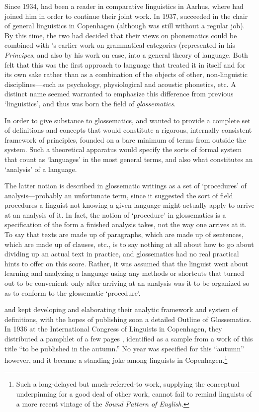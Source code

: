Since 1934, {\Hjelmslev} had been a reader in comparative linguistics in
Aarhus, where {\Uldall} had joined him in order to continue their joint
work. In 1937, {\Hjelmslev} succeeded {\Pedersen} in the chair of general
linguistics in Copenhagen (al\-though {\Uldall} was still without a regular
job). By this time, the two had decided that their views on
phonematics could be combined with {\Hjelmslev}'s earlier work on
grammatical categories (represented in his \textsl{Principes}, and also by his
work \citep{hjelmslev:case} on case, into a general theory of
language. Both felt that this was the first approach to language that
treated it in itself and for its own sake rather than as a combination
of the objects of other, non-linguistic disciplines—such as psychology,
physiological and acoustic phonetics, etc. A distinct name seemed
warranted to emphasize this difference from previous `linguistics',
and thus was born the field of \emph{glossematics}.

In order to give substance to glossematics, {\Hjelmslev} and {\Uldall}
wanted to provide a complete set of definitions and concepts that
would constitute a rigorous, internally consistent framework of
principles, founded on a bare minimum of terms from outside the
system. Such a theoretical apparatus would specify the sorts of formal
system that count as `languages' in the most general terms, and also
what constitutes an `analysis' of a language.

The latter notion is described in glossematic writings as a set of
`procedures' of analysis—probably an unfortunate term, since it
suggested the sort of field procedures a linguist not knowing a given
language might actually apply to arrive at an analysis of it. In
fact, the notion of `procedure' in glossematics is a specification of
the form a finished analysis takes, not the way one arrives at it. To
say that texts are made up of paragraphs, which are made up of
sentences, which are made up of clauses, etc., is to say nothing at
all about how to go about dividing up an actual text in practice, and
glossematics had no real practical hints to offer on this
score. Rather, it was assumed that the linguist went about learning
and analyzing a language using any methods or shortcuts that turned
out to be convenient: only after arriving at an analysis was it to be
organized so as to conform to the glossematic `procedure'.

{\Hjelmslev} and {\Uldall} kept developing and elaborating their analytic
framework and system of definitions, with the hopes of publishing soon
a detailed Outline of Glossematics. In 1936 at the International
Congress of Linguists in Copenhagen, they distributed a pamphlet of a
few pages \citep{hjelmslev.uldall36:outline}, identified as a sample
from a work of this title ``to be published in the autumn.'' No year was
specified for this ``autumn'' however, and it became a standing joke
among linguists in Copenhagen.\footnote{Such a long-delayed but
  much-referred-to work, supplying the conceptual underpinning for a
  good deal of other work, cannot fail to remind linguists of a more
  recent vintage of the \textsl{Sound Pattern of English}.}

